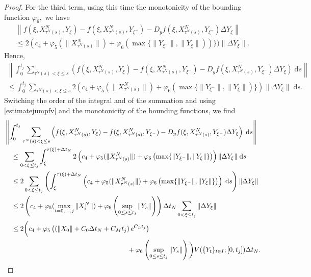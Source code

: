 \documentclass[reqno,12pt]{amsart}
\theoremstyle{plain} %
\theoremstyle{definition} %
\begin{document}
\begin{proof}
    For the third term, using this time the monotonicity of the bounding function $\varphi_6,$ we have
    \begin{multline*}
        \left\|f(\xi, X_{\tau^N(s)}^N, Y_\xi) - f(\xi, X_{\tau^N(s)}^N, Y_{\xi^{-}}) - D_y f(\xi, X_{\tau^N(s)}^N, Y_{\xi^-})\Delta Y_\xi\right\| \\
        \leq 2(c_4 + \varphi_5(\|X_{\tau^N(s)}^N\|) + \varphi_6(\max\{\|Y_{\xi^{-}}\|, \|Y_{\xi}\|))\})\|\Delta Y_\xi\|.
    \end{multline*}
    Hence,
    \begin{multline*}
        \left\|\int_0^{t_j} \sum_{\tau^N(s) < \xi \leq s} \left(f(\xi, X_{\tau^N(s)}^N, Y_\xi) - f(\xi, X_{\tau^N(s)}^N, Y_{\xi^{-}}) - D_y f(\xi, X_{\tau^N(s)}^N, Y_{\xi^-})\Delta Y_\xi\right)\;\mathrm{d}s\right\| \\
        \leq \int_0^{t_j} \sum_{\tau^N(s) < \xi \leq s} 2(c_4 + \varphi_5(\|X_{\tau^N(s)}^N\|) + \varphi_6(\max\{\|Y_{\xi^{-}}\|, \|Y_{\xi}\|)\})\|\Delta Y_\xi\|\;\mathrm{d}s.
    \end{multline*}
    Switching the order of the integral and of the summation and using \eqref{estimatejumpfv} and the monotonicity of the bounding functions, we find
    \begin{align*}
        & \left\|\int_0^{t_j} \sum_{\tau^N(s) < \xi \leq s} \left(f(\xi, X_{\tau^N(s)}^N, Y_\xi) - f(\xi, X_{\tau^N(s)}^N, Y_{\xi^{-}}) - D_y f(\xi, X_{\tau^N(s)}^N, Y_{\xi^-})\Delta Y_\xi\right)\;\mathrm{d}s\right\| \\
        & \quad \leq \sum_{0 < \xi \leq t_j} \int_{\xi}^{\tau(\xi)+\Delta t_N} 2\left(c_4 + \varphi_5(\|X_{\tau^N(s)}^N\|) + \varphi_6\left(\max\{\|Y_{\xi^{-}}\|, \|Y_{\xi}\|\}\right)\right)\|\Delta Y_\xi\|\;\mathrm{d}s \\
        & \quad \leq 2 \sum_{0 < \xi \leq t_j} \left(\int_{\xi}^{\tau(\xi)+\Delta t_N} \left(c_4 + \varphi_5(\|X_{\tau^N(s)}^N\|) + \varphi_6\left(\max\{\|Y_{\xi^{-}}\|, \|Y_{\xi}\|\}\right)\right)\;\mathrm{d}s \right)\|\Delta Y_\xi\| \\
        & \quad \leq 2\left(c_4 + \varphi_5(\max_{i=0, \ldots, j}\|X_i^N\|) + \varphi_6\left(\sup_{0\leq s \leq t_j}\|Y_s\|\right)\right) \Delta t_N\sum_{0 < \xi \leq t_j} \|\Delta Y_\xi\| \\
        & \quad \leq 2\bigg(c_4 + \varphi_5\left(\left(\|X_0\| + C_0\Delta t_N + C_M t_j \right)e^{C_L t_j}\right) \\
        & \hspace{2.5in} + \varphi_6\left(\sup_{0\leq s \leq t_j}\|Y_s\|\right)\bigg) V(\{Y_t\}_{t\in I}; [0, t_j]) \Delta t_N.

\end{align*}
\end{proof}
\end{document}

